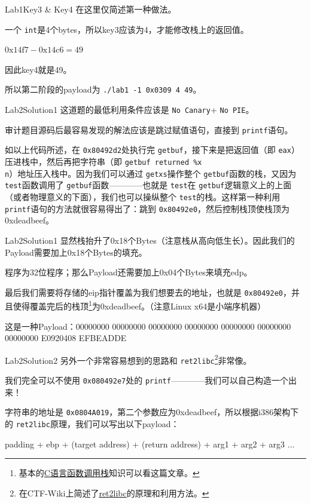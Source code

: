 \documentclass{beamer}
\begin{document}
\begin{frame}{Lab1}{Key3 \& Key4}
    在这里仅简述第一种做法。

    一个 \texttt{int}是4个bytes，所以key3应该为4，才能修改栈上的返回值。

    $ \mathrm{0x14f7}-\mathrm{0x14c6}=49 $

    因此key4就是49。

    所以第二阶段的payload为 \texttt{./lab1 -1 0x0309 4 49}。
\end{frame}

\begin{frame}{Lab2}{Solution1}
    这道题的最低利用条件应该是  \texttt{No Canary}+ \texttt{No PIE}。

    审计题目源码后最容易发现的解法应该是跳过赋值语句，直接到 \texttt{printf}语句。

    如以上代码所述，在 \texttt{0x80492d2}处执行完 \texttt{getbuf}，接下来是把返回值（即 \texttt{eax}）压进栈中，然后再把字符串（即 \texttt{getbuf returned \%x\\n}）地址压入栈中。因为我们可以通过 \texttt{getxs}操作整个 \texttt{getbuf}函数的栈，又因为 \texttt{test}函数调用了 \texttt{getbuf}函数————也就是 \texttt{test}在 \texttt{getbuf}逻辑意义上的上面（或者物理意义的下面），我们也可以操纵整个 \texttt{test}的栈。这样第一种利用 \texttt{printf}语句的方法就很容易得出了：跳到 \texttt{0x80492e0}，然后控制栈顶使栈顶为0xdeadbeef。
\end{frame}

\begin{frame}{Lab2}{Solution1}
    显然栈抬升了0x18个Bytes（注意栈从高向低生长）。因此我们的Payload需要加上0x18个Bytes的填充。

    程序为32位程序；那么Payload还需要加上0x04个Bytes来填充edp。

    最后我们需要将存储的eip指针覆盖为我们想要去的地址，也就是 \texttt{0x80492e0}，并且使得覆盖完后的栈顶\footnote{基本的\href{https://www.cnblogs.com/clover-toeic/p/3755401.html}{C语言函数调用栈}知识可以看这篇文章。}为0xdeadbeef。（注意Linux x64是小端序机器）

    这是一种Payload：00000000 00000000 00000000 00000000 00000000 00000000 00000000 E0920408 EFBEADDE
\end{frame}

\begin{frame}{Lab2}{Solution2}
    另外一个非常容易想到的思路和 \texttt{ret2libc}\footnote{在CTF-Wiki上简述了\href{https://ctf-wiki.org/pwn/linux/user-mode/stackoverflow/x86/basic-rop/\#ret2libc}{ret2libc}的原理和利用方法。}非常像。

    我们完全可以不使用 \texttt{0x080492e7}处的 \texttt{printf}————我们可以自己构造一个出来！

    字符串的地址是 \texttt{0x0804A019}，第二个参数应为0xdeadbeef，所以根据i386架构下的 \texttt{ret2libc}原理，我们可以写出以下payload：

    padding + ebp + (target address) + (return address) + arg1 + arg2 + arg3 ... 
\end{frame}
\end{document}
